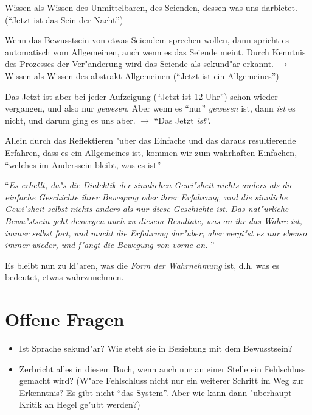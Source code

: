 \documentclass[emulatestandardclasses]{scrartcl}
\begin{document}

\begin{description}[leftmargin=!,labelwidth=\widthof{\bfseries Negation der Negation}]
  \item[Meinen] Wissen als Wissen des Unmittelbaren, des Seienden, dessen was uns darbietet. ("`Jetzt ist das Sein der Nacht"')
  \item[Negation] Wenn das Bewusstsein von etwas Seiendem sprechen wollen, dann spricht es automatisch vom Allgemeinen, auch wenn es das Seiende meint. Durch Kenntnis des Prozesses der Ver"anderung wird das Seiende als sekund"ar erkannt. $\rightarrow$ Wissen als Wissen des abstrakt Allgemeinen ("`Jetzt ist ein Allgemeines"')
  \item[Negation der Negation] Das Jetzt ist aber bei jeder Aufzeigung ("`Jetzt ist 12 Uhr"') schon wieder vergangen, und also nur \emph{gewesen}. Aber wenn es "`nur"' \emph{gewesen} ist, dann \emph{ist} es nicht, und darum ging es uns aber. $\rightarrow$ "`Das Jetzt \emph{ist}"'.
  \item[Erkenntnis] Allein durch das Reflektieren "uber das Einfache und das daraus resultierende Erfahren, dass es ein Allgemeines ist, kommen wir zum wahrhaften Einfachen, "`welches im Anderssein bleibt, was es ist"' 
\end{description}

"`\emph{Es erhellt, da"s die Dialektik der sinnlichen Gewi"sheit nichts anders als die einfache Geschichte ihrer Bewegung oder ihrer Erfahrung, und die sinnliche Gewi"sheit selbst nichts anders als nur diese Geschichte ist. Das nat"urliche Bewu"stsein geht
deswegen auch zu diesem Resultate, was an ihr das Wahre ist, immer selbst fort, und macht die Erfahrung dar"uber; aber vergi"st es nur ebenso immer wieder, und f"angt die Bewegung von vorne an. }"'\newline

Es bleibt nun zu kl"aren, was die \emph{Form der Wahrnehmung} ist, d.h. was es bedeutet, etwas wahrzunehmen.

\section*{Offene Fragen}

\begin{itemize}
  \item Ist Sprache sekund"ar? Wie steht sie in Beziehung mit dem Bewusstsein?
  \item Zerbricht alles in diesem Buch, wenn auch nur an einer Stelle ein Fehlschluss gemacht wird? (W"are Fehlschluss nicht nur ein weiterer Schritt im Weg zur Erkenntnis? Es gibt nicht "`das System"'. Aber wie kann dann "uberhaupt Kritik an Hegel ge"ubt werden?)
\end{itemize}
\end{document}
